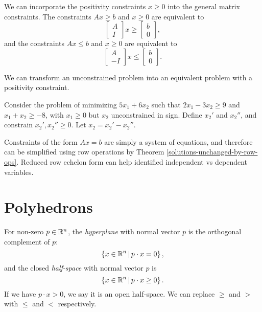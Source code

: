 \begin{prop}
    We can incorporate the positivity constraints $x \geq 0$ into the general matrix constraints. The constraints $Ax \geq b$ and $x \geq 0$ are equivalent to \[\begin{bmatrix} A \\ I\end{bmatrix}x \geq \begin{bmatrix} b \\ 0 \end{bmatrix},\]
    and the constraints $Ax \leq b$ and $x \geq 0$ are equivalent to \[\begin{bmatrix} A \\ -I\end{bmatrix}x \leq \begin{bmatrix} b \\ 0 \end{bmatrix}.\]
\end{prop}

\begin{prop}
    We can transform an unconstrained problem into an equivalent problem with a positivity constraint.
\end{prop}

\begin{exmp}
    Consider the problem of minimizing $5x_1 + 6x_2$ such that $2x_1 - 3x_2 \geq 9$ and $x_1 + x_2 \geq -8$, with $x_1 \geq 0$ but $x_2$ unconstrained in sign. Define $x_2'$ and $x_2''$, and constrain $x_2', x_2'' \geq 0$. Let $x_2 = x_2' - x_2''$.
\end{exmp}

\begin{rmk}
    Constraints of the form $Ax = b$ are simply a system of equations, and therefore can be simplified using row operations by Theorem \ref{solutions-unchanged-by-row-ops}. Reduced row echelon form can help identified independent vs dependent variables.
\end{rmk}

\section{Polyhedrons}

\begin{defn}
    For non-zero $p \in \mathbb{R}^n$, the \emph{hyperplane} with normal vector $p$ is the orthogonal complement of $p$: \[\left\{x \in \mathbb{R}^n \,\middle|\, p \cdot x = 0 \right\},\]
    and the closed \emph{half-space} with normal vector $p$ is
    \[\left\{x \in \mathbb{R}^n \,\middle|\, p \cdot x \geq 0 \right\}.\]
    If we have $p \cdot x > 0$, we say it is an open half-space. We can replace $\geq$ and $>$ with $\leq$ and $<$ respectively.
\end{defn}

